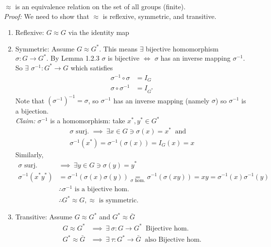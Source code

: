 \begin{proposition}\label{prop:iso-equiv-rel}
$\approx$ is an equivalence relation on the set of all groups (finite).\\
\textit{Proof:} We need to show that $\approx$ is reflexive, symmetric, and transitive.
\begin{enumerate}
    \item Reflexive: $G\approx G$ via the identity map
    \item Symmetric: Assume $G\approx G^*$. This means $\exists$ bijective homomorphism
    $\sigma: G\rightarrow G^*$. By Lemma 1.2.3 $\sigma$ is bijective $\iff$ $\sigma$ has an inverse
    mapping $\sigma^{-1}$. So $\exists$ $\sigma^{-1}: G^*\rightarrow G$ which satisfies
    \begin{align}
        \sigma^{-1}\circ \sigma &= I_G \nonumber \\
        \sigma\circ \sigma^{-1}&=I_{G^*}\nonumber
    \end{align}
    Note that $(\sigma^{-1})^{-1}=\sigma $, so $\sigma^{-1}$ has an inverse mapping (namely
    $\sigma$) so $\sigma^{-1}$ is a bijection.\\
    \textit{Claim:} $\sigma^{-1}$ is a homomorphism: take $x^*,y^*\in G^*$
    \begin{align}
        \sigma \text{ surj. } \implies \ \exists x\in G \ni \sigma(x)=x^* \ \text{ and} \nonumber \\
        \sigma^{-1}(x^*)=\sigma^{-1}(\sigma(x))=I_G(x)=x \nonumber
    \end{align}
    Similarly,
    \begin{align}
        \sigma \text{ surj. }&\implies \ \exists y\in G \ni \sigma(y)=y^* \nonumber \\
        \sigma^{-1}(x^*y^*)&=\sigma^{-1}(\sigma(x)\sigma(y))\underset{\sigma \text{ hom.}}{=}\sigma^{-1}(\sigma(xy))=xy=\sigma^{-1}(x)\sigma^{-1}(y) \nonumber \\
        &\therefore \sigma^{-1} \text{ is a bijective hom.} \nonumber \\
        &\therefore G^*\approx G, \approx \text{ is symmetric}. \nonumber
    \end{align}
    \item Transitive: Assume $G\approx G^*$ and $G^*\approx \bar{G}$
    \begin{align}
        G\approx G^* &\implies \ \exists \ \sigma: G\rightarrow G^* \ \text{ Bijective hom.} \nonumber \\
        G^*\approx \bar{G} &\implies \ \exists \ \tau: G^* \rightarrow \bar{G} \ \text{ also Bijective hom.}\nonumber

\end{align}
\end{enumerate}
\end{proposition}
